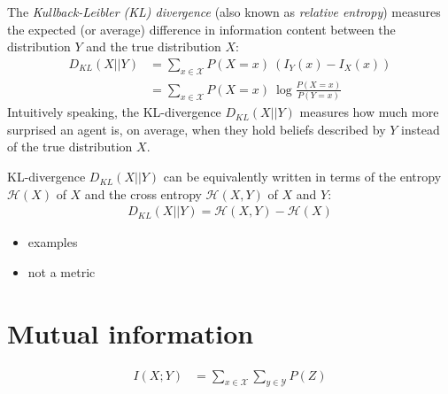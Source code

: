 \documentclass[nobib,nofonts]{tufte-handout}
\begin{document}
The \emph{Kullback-Leibler (KL) divergence} (also known as \emph{relative entropy}) measures the expected (or average) difference in information content between the distribution $Y$ and the true distribution $X$:
\begin{align*}
  D_{KL}(X || Y) & = \sum_{x \in \mathcal{X}} P(X = x) \ \left ( I_{Y}(x) - I_{X}(x) \right ) \\
  & = \sum_{x \in \mathcal{X}} P(X = x) \ \log  \frac{P(X=x)}{P(Y=x)}
\end{align*}
Intuitively speaking, the KL-divergence $D_{KL}(X || Y)$ measures how much more surprised an agent is, on average, when they hold beliefs described by $Y$ instead of the true distribution $X$.

KL-divergence $D_{KL}(X || Y)$ can be equivalently written in terms of the entropy $\mathcal{H}(X)$ of $X$ and the cross entropy $\mathcal{H}(X,Y)$ of $X$ and $Y$:
\begin{align*}
  D_{KL}(X || Y) = \mathcal{H}(X,Y) - \mathcal{H}(X)
\end{align*}

\begin{itemize}
  \item examples
  \item not a metric
\end{itemize}


\section{Mutual information}

\begin{align*}
  I(X;Y) & = \sum_{x \in \mathcal{X}} \sum_{y \in \mathcal{Y}} P(Z)
\end{align*}
\end{document}
